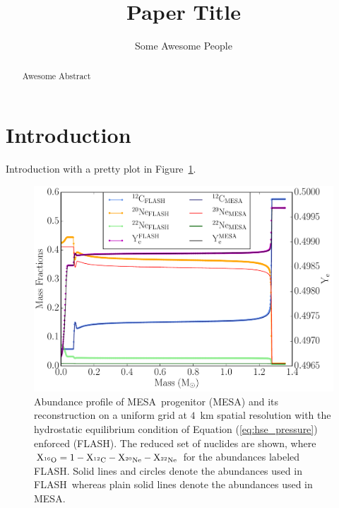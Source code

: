 \documentclass[iop,apj]{emulateapj}
\newcommand{\eqqref}[1]{Equation (\ref{#1})}
\newcommand{\figref}[1]{Figure~\ref{#1}}
\newcommand{\C}[1]{\ensuremath{{}^{#1}{\rm C}}}
\newcommand{\Ox}[1]{\ensuremath{{}^{#1}{\rm O}}}
\newcommand{\Ne}[1]{\ensuremath{{}^{#1}{\rm Ne}}}
\newcommand{\code}[1]{\textsc{#1}}
\newcommand{\FLASH}{\code{FLASH}}
\newcommand{\MESA}{\code{MESA}}
\begin{document}
\title{Paper Title}

\author{
Some Awesome People
}


\begin{abstract}
Awesome Abstract
\end{abstract}


\section{Introduction}
\label{sec:intro}

Introduction with a pretty plot in \figref{fig:progenitor_abundances}.

\begin{figure}[t]
	\includegraphics[width=\linewidth]{figures/samples/cf_wdb_mesa_comp_vs_mass.pdf}
	\caption{\label{fig:progenitor_abundances} Abundance profile
          of \MESA\ progenitor (\MESA) and its reconstruction on a
          uniform grid at $4$~km spatial resolution with the hydrostatic equilibrium condition of
          \eqqref{eq:hse_pressure} enforced (\FLASH). The reduced set
          of nuclides are shown, where $\mathrm{X_{\Ox{16}} = 1 -
            X_{\C{12}} - X_{\Ne{20}} - X_{\Ne{22}}}$ for the
          abundances labeled \FLASH. Solid lines and circles denote
          the abundances used in \FLASH\ whereas plain solid lines
          denote the abundances used in \MESA.}
\end{figure}
\end{document}
